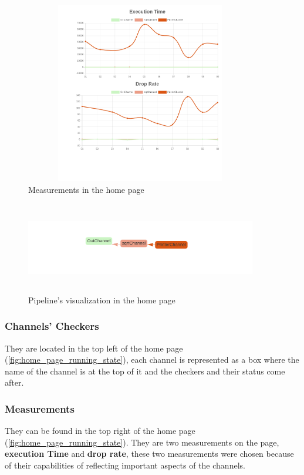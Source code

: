 \begin{figure}[H]
	\centering
	\includegraphics[width=0.9\textwidth,height=300px]{images/measures_home_page.png}
	\caption{Measurements in the home page}
	\label{fig:measures_home_page}
\end{figure}

\begin{figure}[H]
	\centering
	\includegraphics[width=0.9\textwidth,height=150px]{images/pipeline_viz.png}
	\caption{Pipeline's visualization in the home page}
	\label{fig:pipeline_viz_home_page}
\end{figure}

\subsubsection{Channels' Checkers}
They are located in the top left of the home page (\ref{fig:home_page_running_state}), 
each channel is represented as a box where the name
of the channel is at the top of it and the checkers and their status come after. 

\subsubsection{Measurements}\label{measuremets_home}
They can be found in the top right of the home page (\ref{fig:home_page_running_state}). They are
two measurements on the page, \textbf{execution Time} and \textbf{drop rate}, these two measurements
were chosen because of their capabilities of reflecting important aspects of the channels.

